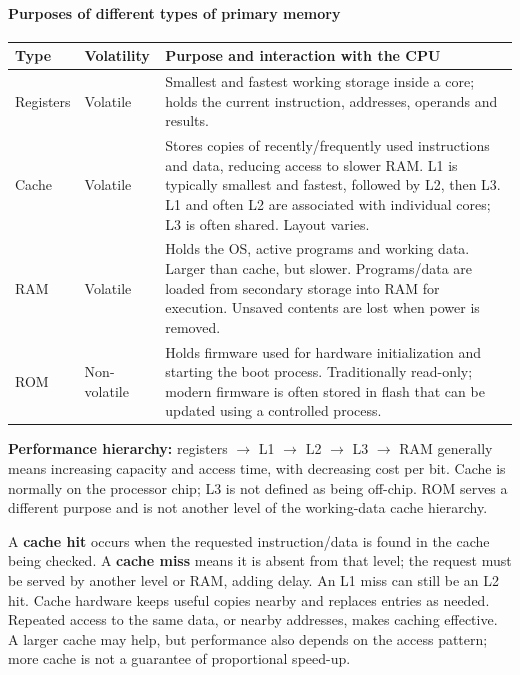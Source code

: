 \documentclass[a4paper,12pt]{article}
\begin{document}
\paragraph{Purposes of different types of primary memory}
\begin{center}
\begin{tabularx}{0.98\linewidth}{p{2.4cm} p{2.1cm} X}
\toprule
\textbf{Type} & \textbf{Volatility} & \textbf{Purpose and interaction with the CPU} \\
\midrule
Registers & Volatile & Smallest and fastest working storage inside a core; holds the current instruction, addresses, operands and results. \\
Cache & Volatile & Stores copies of recently/frequently used instructions and data, reducing access to slower RAM. L1 is typically smallest and fastest, followed by L2, then L3. L1 and often L2 are associated with individual cores; L3 is often shared. Layout varies. \\
RAM & Volatile & Holds the OS, active programs and working data. Larger than cache, but slower. Programs/data are loaded from secondary storage into RAM for execution. Unsaved contents are lost when power is removed. \\
ROM & Non-volatile & Holds firmware used for hardware initialization and starting the boot process. Traditionally read-only; modern firmware is often stored in flash that can be updated using a controlled process. \\
\bottomrule
\end{tabularx}
\end{center}
\textbf{Performance hierarchy:} registers $\to$ L1 $\to$ L2 $\to$ L3 $\to$ RAM generally means increasing capacity and access time, with decreasing cost per bit. Cache is normally on the processor chip; L3 is not defined as being off-chip. ROM serves a different purpose and is not another level of the working-data cache hierarchy.

A \textbf{cache hit} occurs when the requested instruction/data is found in the cache being checked. A \textbf{cache miss} means it is absent from that level; the request must be served by another level or RAM, adding delay. An L1 miss can still be an L2 hit. Cache hardware keeps useful copies nearby and replaces entries as needed. Repeated access to the same data, or nearby addresses, makes caching effective. A larger cache may help, but performance also depends on the access pattern; more cache is not a guarantee of proportional speed-up.
\end{document}
